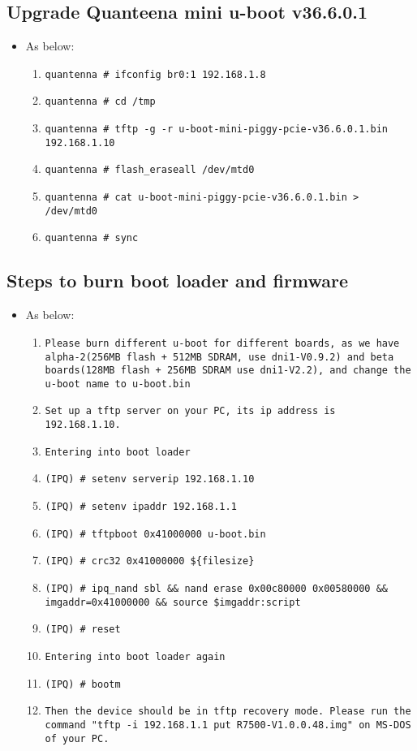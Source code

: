 \documentclass[12pt]{report}
\begin{document}
    \subsection{Upgrade Quanteena mini u-boot v36.6.0.1}
    \begin{itemize}
    \item As below:
    	\begin{enumerate}
		\item \texttt{quantenna \# ifconfig br0:1 192.168.1.8}
		\item \texttt{quantenna \# cd /tmp}
		\item \texttt{quantenna \# tftp -g -r u-boot-mini-piggy-pcie-v36.6.0.1.bin 192.168.1.10}
		\item \texttt{quantenna \# flash\_eraseall /dev/mtd0}
		\item \texttt{quantenna \# cat u-boot-mini-piggy-pcie-v36.6.0.1.bin > /dev/mtd0}
		\item \texttt{quantenna \# sync}
    	\end{enumerate}
    \end{itemize}

    \subsection{Steps to burn boot loader and firmware}
    \begin{itemize}
    \item As below:
            \begin{enumerate}
	    	\item \texttt{Please burn different u-boot for different boards, as we have alpha-2(256MB flash + 512MB SDRAM, use dni1-V0.9.2) and beta boards(128MB flash + 256MB SDRAM use dni1-V2.2), and change the u-boot name to u-boot.bin}
		\item \texttt{Set up a tftp server on your PC, its ip address is 192.168.1.10.}
		\item \texttt{Entering into boot loader}
		\item \texttt{(IPQ) \# setenv serverip 192.168.1.10}
		\item \texttt{(IPQ) \# setenv ipaddr 192.168.1.1}
		\item \texttt{(IPQ) \# tftpboot 0x41000000 u-boot.bin}
		\item \texttt{(IPQ) \# crc32 0x41000000 \$\{filesize\}}
		\item \texttt{(IPQ) \# ipq\_nand sbl \&\& nand erase 0x00c80000 0x00580000 \&\& imgaddr=0x41000000 \&\& source \$imgaddr:script}
		\item \texttt{(IPQ) \# reset}
		\item \texttt{Entering into boot loader again}
		\item \texttt{(IPQ) \# bootm}
		\item \texttt{Then the device should be in tftp recovery mode. Please run the command "tftp -i 192.168.1.1 put R7500-V1.0.0.48.img" on MS-DOS of your PC.}
            \end{enumerate}
    \end{itemize}
\end{document}
